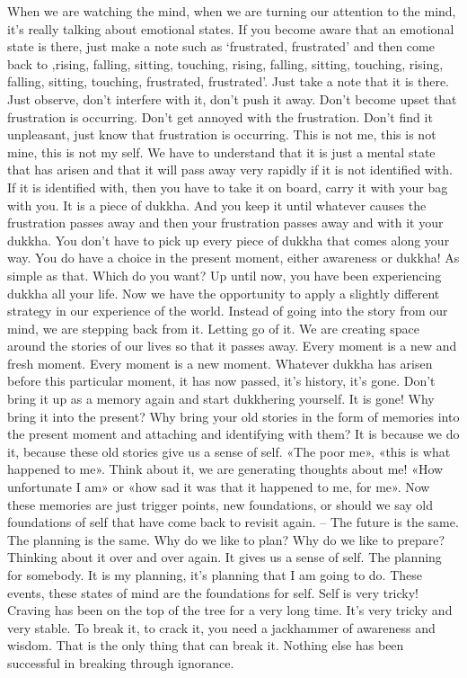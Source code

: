 \documentclass[letterpaper,10pt,english]{sphinxmanual}
\begin{document}
\sphinxAtStartPar
{}  When we are watching the mind, when we are turning our attention to
the mind, it’s really talking about emotional states. If you become aware that
an emotional state is there, just make a note such as ‘frustrated, frustrated’
and then come back to ‚rising, falling, sitting, touching, rising, falling, sitting, touching, rising, falling, sitting, touching, frustrated, frustrated’. Just
take a note that it is there. Just observe, don’t interfere with it, don’t push it
away. Don’t become upset that frustration is occurring. Don’t get annoyed
with  the  frustration.  Don’t  find  it  unpleasant,  just  know  that  frustration  is
occurring. This is not me, this is not mine, this is not my self. We have to
understand that it is just a mental state that has arisen and that it will pass
away very rapidly if it is not identified with. If it is identified with, then you
have  to  take  it  on  board,  carry  it  with  your  bag  with  you.  It  is  a  piece  of
dukkha. And you keep it until whatever causes the frustration passes away
and then your frustration passes away and with it your dukkha. You don’t
have to pick up every piece of dukkha that comes along your way. You do
have a choice in the present moment, either awareness or dukkha! As simple
as  that.  Which  do  you  want?  Up  until  now,  you  have  been  experiencing
dukkha all your life. Now we have the opportunity to apply a slightly different strategy in our experience of the world. Instead of going into the story
from our mind, we are stepping back from it. Letting go of it. We are creating
space around the stories of our lives so that it passes away. Every moment is
a new and fresh moment. Every moment is a new moment. Whatever dukkha
has arisen before this particular moment, it has now passed, it’s history, it’s
gone.  Don’t  bring  it  up  as  a  memory  again  and  start  dukkhering  yourself.
It is gone! Why bring it into the present? Why bring your old stories in the
form  of  memories  into  the  present  moment  and  attaching  and  identifying
with them? It is because we do it, because these old stories give us a sense of
self. «The poor me», «this is what happened to me». Think about it, we are
generating thoughts about me! «How unfortunate I am» or «how sad it was
that it happened to me, for me». Now these memories are just trigger points,
new foundations, or should we say old foundations of self that have come
back  to  revisit  again.  – The  future  is  the  same. The  planning  is  the  same.
Why do we like to plan? Why do we like to prepare? Thinking about it over
and over again. It gives us a sense of self. The planning for somebody. It is
  my planning, it’s planning that I am going to do. These events, these states
of mind are the foundations for self. Self is very tricky! Craving has been
on the top of the tree for a very long time. It’s very tricky and very stable.
To break it, to crack it, you need a jackhammer of awareness and wisdom.
That is the only thing that can break it. Nothing else has been successful in
breaking through ignorance.
\end{document}
